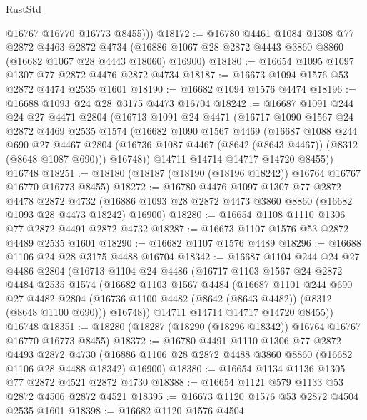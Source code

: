 \begin{lexlean}{RustStd}
\begin{coremodule}
          @16767
          @16770
          @16773
          @8455)))
@18172 := @16780
    @4461
    @1084
    @1308
    @77
    @2872
    @4463
    @2872
    @4734
    (@16886 @1067 @28 @2872 @4443 @3860 @8860 (@16682 @1067 @28 @4443 @18060) @16900)
@18180 := @16654 @1095 @1097 @1307 @77 @2872 @4476 @2872 @4734
@18187 := @16673 @1094 @1576 @53 @2872 @4474 @2535 @1601
@18190 := @16682 @1094 @1576 @4474
@18196 := @16688 @1093 @24 @28 @3175 @4473 @16704
@18242 := @16687
    @1091
    @244
    @24
    @27
    @4471
    @2804
    (@16713
      @1091
      @24
      @4471
      (@16717
        @1090
        @1567
        @24
        @2872
        @4469
        @2535
        @1574
        (@16682
          @1090
          @1567
          @4469
          (@16687
            @1088
            @244
            @690
            @27
            @4467
            @2804
            (@16736 @1087 @4467 (@8642 (@8643 @4467)) (@8312 (@8648 @1087 @690)))
            @16748))
        @14711
        @14714
        @14717
        @14720
        @8455))
    @16748
@18251 := @18180 (@18187 (@18190 (@18196 @18242)) @16764 @16767 @16770 @16773 @8455)
@18272 := @16780
    @4476
    @1097
    @1307
    @77
    @2872
    @4478
    @2872
    @4732
    (@16886 @1093 @28 @2872 @4473 @3860 @8860 (@16682 @1093 @28 @4473 @18242) @16900)
@18280 := @16654 @1108 @1110 @1306 @77 @2872 @4491 @2872 @4732
@18287 := @16673 @1107 @1576 @53 @2872 @4489 @2535 @1601
@18290 := @16682 @1107 @1576 @4489
@18296 := @16688 @1106 @24 @28 @3175 @4488 @16704
@18342 := @16687
    @1104
    @244
    @24
    @27
    @4486
    @2804
    (@16713
      @1104
      @24
      @4486
      (@16717
        @1103
        @1567
        @24
        @2872
        @4484
        @2535
        @1574
        (@16682
          @1103
          @1567
          @4484
          (@16687
            @1101
            @244
            @690
            @27
            @4482
            @2804
            (@16736 @1100 @4482 (@8642 (@8643 @4482)) (@8312 (@8648 @1100 @690)))
            @16748))
        @14711
        @14714
        @14717
        @14720
        @8455))
    @16748
@18351 := @18280 (@18287 (@18290 (@18296 @18342)) @16764 @16767 @16770 @16773 @8455)
@18372 := @16780
    @4491
    @1110
    @1306
    @77
    @2872
    @4493
    @2872
    @4730
    (@16886 @1106 @28 @2872 @4488 @3860 @8860 (@16682 @1106 @28 @4488 @18342) @16900)
@18380 := @16654 @1134 @1136 @1305 @77 @2872 @4521 @2872 @4730
@18388 := @16654 @1121 @579 @1133 @53 @2872 @4506 @2872 @4521
@18395 := @16673 @1120 @1576 @53 @2872 @4504 @2535 @1601
@18398 := @16682 @1120 @1576 @4504

\end{coremodule}
\end{lexlean}
